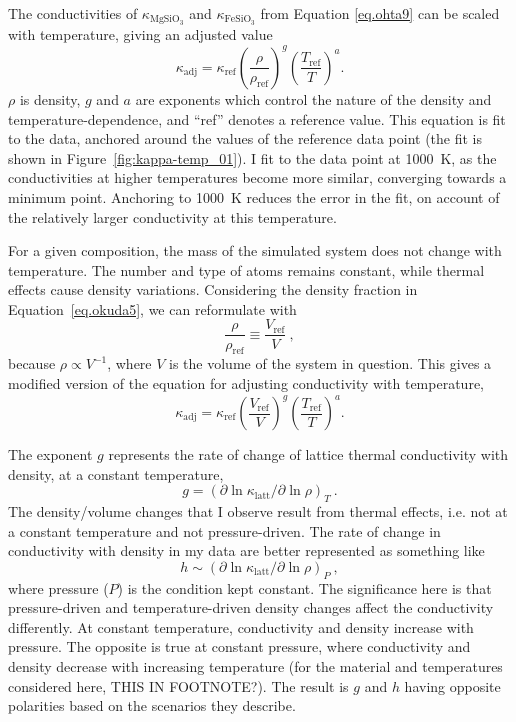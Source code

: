 The conductivities of $\kappa_{\mathrm{MgSiO_{3}}}$ and $\kappa_{\mathrm{FeSiO_{3}}}$ from Equation \ref{eq.ohta9} can be scaled with temperature, giving an adjusted value 
%
\begin{equation}
\kappa_{\mathrm{adj}}=\kappa_{\mathrm{ref}}\left ( \frac{\rho}{\rho_{\mathrm{ref}}} \right )^{g}\left ( \frac{T_{\mathrm{ref}}}{T} \right )^{a}.
\label{eq.okuda5}
\end{equation}
%
$\rho$ is density, $g$ and $a$ are exponents which control the nature of the density and temperature-dependence, and ``ref'' denotes a reference value. This equation is fit to the data, anchored around the values of the reference data point (the fit is shown in Figure~\ref{fig:kappa-temp_01}). I fit to the data point at 1000~K, as the conductivities at higher temperatures become more similar, converging towards a minimum point. Anchoring to 1000~K reduces the error in the fit, on account of the relatively larger conductivity at this temperature.

For a given composition, the mass of the simulated system does not change with temperature. The number and type of atoms remains constant, while thermal effects cause density variations. Considering the density fraction in Equation~\ref{eq.okuda5}, we can reformulate with
%
\begin{equation}
\frac{\rho }{\rho _{\mathrm{ref}}} \equiv \frac{V_{\mathrm{ref}}}{V} \ ,
\label{eq.rho_to_vol}
\end{equation}
%
because $\rho \propto V^{-1}$, where $V$ is the volume of the system in question. This gives a modified version of the equation for adjusting conductivity with temperature,
%
\begin{equation}
\kappa_{\mathrm{adj}}=\kappa_{\mathrm{ref}}\left ( \frac{V_{\mathrm{ref}}}{V} \right )^{g}\left ( \frac{T_{\mathrm{ref}}}{T} \right )^{a}.
\label{eq.okuda5mod}
\end{equation}

The exponent $g$ represents the rate of change of lattice thermal conductivity with density, at a constant temperature,
%
\begin{equation}
g=\left( \partial \ln \kappa_{\mathrm{latt}} / \partial \ln \rho \right) _{T} \ .
\label{eq.g_def}
\end{equation}
%
The density/volume changes that I observe result from thermal effects, i.e. not at a constant temperature and not pressure-driven. The rate of change in conductivity with density in my data are better represented as something like 
%
\begin{equation}
h \sim \left( \partial \ln \kappa_{\mathrm{latt}} / \partial \ln \rho \right) _{P} \ ,
\label{eq.g_def}
\end{equation}
%
where pressure ($P$) is the condition kept constant. The significance here is that pressure-driven and temperature-driven density changes affect the conductivity differently. At constant temperature, conductivity and density increase with pressure. The opposite is true at constant pressure, where conductivity and density decrease with increasing temperature (for the material and temperatures considered here, THIS IN FOOTNOTE?). The result is $g$ and $h$ having opposite polarities based on the scenarios they describe.

